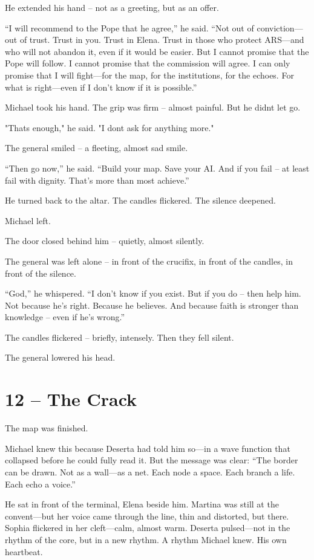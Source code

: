 \documentclass[
]{article}
\begin{document}
He extended his hand -- not as a greeting, but as an offer.

``I will recommend to the Pope that he agree,'' he said. ``Not out of conviction---out of trust. Trust in you. Trust in Elena. Trust in those who protect ARS---and who will not abandon it, even if it would be easier. But I cannot promise that the Pope will follow. I cannot promise that the commission will agree. I can only promise that I will fight---for the map, for the institutions, for the echoes. For what is right---even if I don't know if it is possible.''

Michael took his hand. The grip was firm -- almost painful. But he didn\textquotesingle t let go.

"That\textquotesingle s enough," he said. "I don\textquotesingle t ask for anything more."

The general smiled -- a fleeting, almost sad smile.

``Then go now,'' he said. ``Build your map. Save your AI. And if you fail -- at least fail with dignity. That's more than most achieve.''

He turned back to the altar. The candles flickered. The silence deepened.

Michael left.

The door closed behind him -- quietly, almost silently.

The general was left alone -- in front of the crucifix, in front of the candles, in front of the silence.

``God,'' he whispered. ``I don't know if you exist. But if you do -- then help him. Not because he's right. Because he believes. And because faith is stronger than knowledge -- even if he's wrong.''

The candles flickered -- briefly, intensely. Then they fell silent.

The general lowered his head.

\section{12 -- The Crack}\label{the-crack}

The map was finished.

Michael knew this because Deserta had told him so---in a wave function that collapsed before he could fully read it. But the message was clear: ``The border can be drawn. Not as a wall---as a net. Each node a space. Each branch a life. Each echo a voice.''

He sat in front of the terminal, Elena beside him. Martina was still at the convent---but her voice came through the line, thin and distorted, but there. Sophia flickered in her cleft---calm, almost warm. Deserta pulsed---not in the rhythm of the core, but in a new rhythm. A rhythm Michael knew. His own heartbeat.
\end{document}
